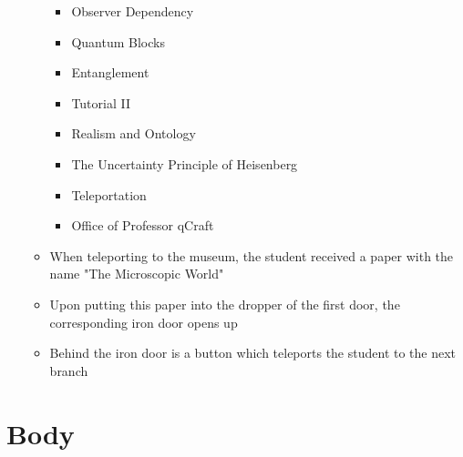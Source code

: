 \documentclass[11pt,twoside]{report} %
\begin{document}
\begin{itemize}
\begin{itemize}
\begin{itemize}
			\item Observer Dependency
			\item Quantum Blocks
			\item Entanglement
			\item Tutorial II
			\item Realism and Ontology
			\item The Uncertainty Principle of Heisenberg
			\item Teleportation
			\item Office of Professor qCraft
		\end{itemize}
		\item When teleporting to the museum, the student received a paper with the name "The Microscopic World"
		\item Upon putting this paper into the dropper of the first door, the corresponding iron door opens up
		\item Behind the iron door is a button which teleports the student to the next branch
	\end{itemize}
\end{itemize}

\section{Body}
\end{document}
